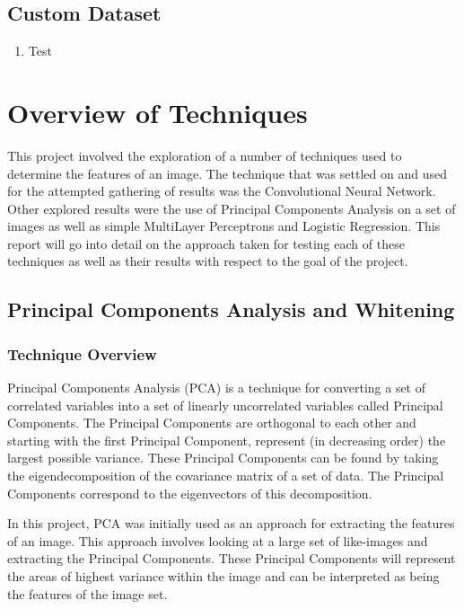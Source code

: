 \documentclass{article}
\begin{document}
\subsection{Custom Dataset}

\begin{enumerate}
  \item Test
\end{enumerate}

\newpage
\section{Overview of Techniques}

This project involved the exploration of a number of techniques used to determine the features of an image. The technique that was settled
on and used for the attempted gathering of results was the Convolutional Neural Network. Other explored results were the use of Principal
Components Analysis on a set of images as well as simple MultiLayer Perceptrons and Logistic Regression. This report will go into detail on
the approach taken for testing each of these techniques as well as their results with respect to the goal of the project.

\subsection{Principal Components Analysis and Whitening}
  \subsubsection{Technique Overview}
  
  Principal Components Analysis (PCA) is a technique for converting a set of correlated variables into a set of linearly uncorrelated variables
  called Principal Components. The Principal Components are orthogonal to each other and starting with the first Principal Component, represent
  (in decreasing order) the largest possible variance. These Principal Components can be found by taking the eigendecomposition of the covariance
  matrix of a set of data. The Principal Components correspond to the eigenvectors of this decomposition.

  In this project, PCA was initially used as an approach for extracting the features of an image. This approach involves looking at a large set of
  like-images and extracting the Principal Components. These Principal Components will represent the areas of highest variance within the image and
  can be interpreted as being the features of the image set.
  
\end{document}
